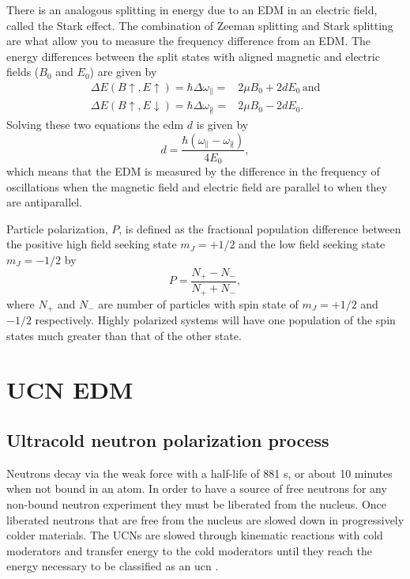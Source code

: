 There is an analogous splitting in energy due to an EDM in an electric field, called the Stark effect. The combination of Zeeman splitting and Stark splitting are what allow you to measure the frequency difference from an EDM. The energy differences between the split states with aligned magnetic and electric fields ($B_0$ and $E_0$) are given by
\begin{align}
    \Delta E(B\uparrow,E\uparrow) = \hbar \Delta \omega_{\parallel} =& 2\mu B_0 + 2d  E_0 \,\textrm{and}\\
    \Delta E(B\uparrow,E\downarrow)= \hbar \Delta \omega_{\nparallel} =& 2\mu B_0 -2 d E_0.
\end{align}
Solving these two equations the \gls{edm} $d$ is given by
\begin{equation}
    d=\frac{\hbar(\omega_\parallel - \omega_\nparallel)}{4E_0},
\end{equation}
which means that the EDM is measured by the difference in the frequency of oscillations when the magnetic field and electric field are parallel to when they are antiparallel.

Particle polarization, $P$, is defined as the fractional population difference between the positive high field seeking state $m_J=+1/2$ and the low field seeking state $m_J=-1/2$ by
\begin{equation}
    P  =\frac{N_+-N_-}{N_+ +N_-},
\end{equation}
where $N_+$ and $N_-$ are number of particles with spin state of $m_J = +1/2$ and $-1/2$ respectively. Highly polarized systems will have one population of the spin states much greater than that of the other state.  


\section{UCN EDM}

\subsection{Ultracold neutron polarization process}
Neutrons decay via the weak force with a half-life of 881 s, or about 10 minutes when not bound in an atom. In order to have a source of free neutrons for any non-bound neutron experiment they must be liberated from the nucleus. Once liberated neutrons that are free from the nucleus are slowed down in progressively colder materials. The UCNs are slowed through kinematic reactions with cold moderators and transfer energy to the cold moderators until they reach the energy necessary to be classified as an \gls{ucn} \cite{Golub}.  

